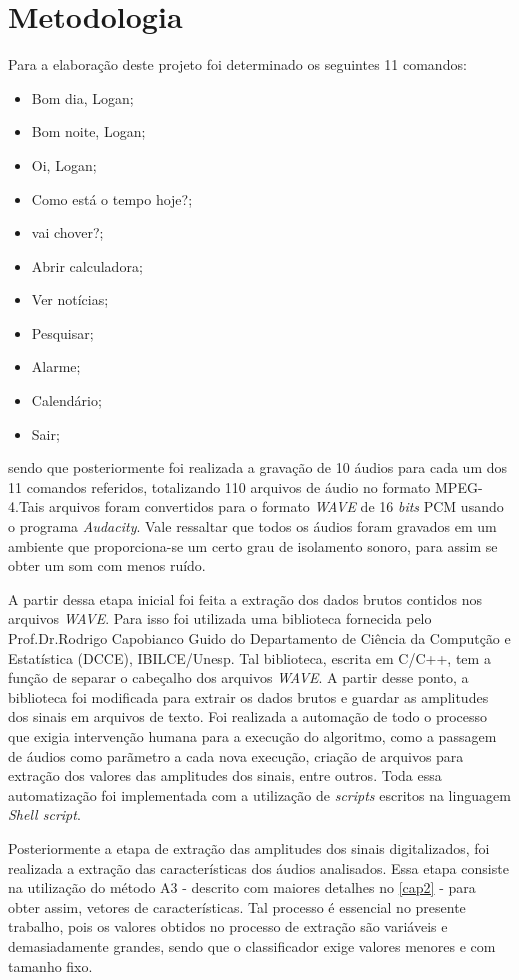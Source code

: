 \documentclass[a4paper,12pt,twoside,openright]{report}
\begin{document}
\section{Metodologia}
\par Para a elabora\c{c}\~{a}o deste projeto foi determinado os seguintes 11 comandos:
\begin{itemize}
	\item{}Bom dia, Logan;
	\item{}Bom noite, Logan;
	\item{}Oi, Logan;
	\item{}Como est\'{a} o tempo hoje?;
	\item{}vai chover?;
	\item{}Abrir calculadora;
	\item{}Ver not\'{i}cias;
	\item{}Pesquisar;
	\item{}Alarme;
	\item{}Calend\'{a}rio;
	\item{}Sair;	
\end{itemize}
sendo que posteriormente foi realizada a grava\c{c}\~{a}o de 10 \'{a}udios para cada um dos 11 comandos referidos, totalizando 110 arquivos de \'{a}udio no formato MPEG-4.Tais arquivos foram convertidos para o formato \textit{WAVE} de 16 \textit{bits} PCM usando o programa \textit{Audacity}. Vale ressaltar que todos os \'{a}udios foram gravados em um ambiente que proporciona-se um certo grau de isolamento sonoro, para assim se obter um som com menos ru\'{i}do.
\par A partir dessa etapa inicial foi feita a extra\c{c}\~{a}o dos dados brutos contidos nos arquivos \textit{WAVE}. Para isso foi utilizada uma biblioteca fornecida pelo Prof.Dr.Rodrigo Capobianco Guido do Departamento de Ci\^{e}ncia da Comput{\c c}\~{a}o e Estat\'{i}stica (DCCE), IBILCE/Unesp. Tal biblioteca, escrita em C/C++, tem a fun\c{c}\~{a}o de separar o cabe{\c c}alho dos arquivos \textit{WAVE}. A partir desse ponto, a biblioteca foi modificada para extrair os dados brutos e guardar as amplitudes dos sinais em arquivos de texto. Foi realizada a automa{\c c}\~{a}o de todo o processo que exigia interven{\c c}\~{a}o humana para a execu{\c c}\~{a}o do algoritmo, como a passagem  de \'{a}udios como par\~{a}metro a cada nova execu{\c c}\~{a}o, cria{\c c}\~{a}o de arquivos para extra{\c c}\~{a}o dos valores das amplitudes dos sinais, entre outros. Toda essa automatiza{\c c}\~{a}o foi implementada com a utiliza{\c c}\~{a}o de \textit{scripts} escritos na linguagem \textit{Shell script}.
\par Posteriormente a etapa de extra{\c c}\~{a}o das amplitudes dos sinais digitalizados, foi realizada a extra{\c c}\~{a}o das caracter\'{i}sticas dos \'{a}udios analisados. Essa etapa consiste na utiliza{\c c}\~{a}o do m\'{e}todo A3 - descrito com maiores detalhes no \ref{cap2} - para obter assim, vetores de caracter\'{i}sticas. Tal processo \'{e} essencial no presente trabalho, pois os valores obtidos no processo de extra{\c c}\~{a}o s\~{a}o vari\'{a}veis e demasiadamente grandes, sendo que o classificador exige valores menores e com tamanho fixo.
\end{document}
